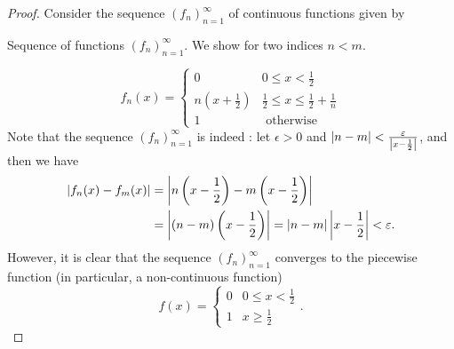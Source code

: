 \documentclass[notoc,notitlepage]{tufte-book}
\begin{document}
\begin{proof}
  Consider the sequence $(f_n)_{n=1}^{\infty}$ of continuous functions given by
  \begin{marginfigure}
    \centering
    \caption{Sequence of functions $(f_n)_{n=1}^{\infty}$. We show for two indices $n < m$.}\label{fig:sequence_of_functions_f_n___n_1_infty_we_show_for_two_indices_n_m_}
  \end{marginfigure}
  \begin{equation*}
    f_n(x) = \begin{cases}
      0 & 0 \leq x < \frac{1}{2} \\
      n \left( x + \frac{1}{2} \right) & \frac{1}{2} \leq x \leq \frac{1}{2} +
      \frac{1}{n} \\
      1 & \text{ otherwise }
    \end{cases}
  \end{equation*}
  Note that the sequence $(f_n)_{n=1}^{\infty}$ is indeed : let
  $\epsilon > 0$ and $\left|n - m\right| < \frac{\varepsilon}{\left|x - \frac{1}{2}\right|}$, and
  then we have
  \begin{align*}
    \left|f_n(x) - f_m(x)\right|
    &= \left|n \left( x - \frac{1}{2} \right) - m \left( x - \frac{1}{2}\right)\right|
    \\
    &= \left|(n - m) \left( x - \frac{1}{2} \right)\right|
    = \left|n-m\right|\left|x - \frac{1}{2}\right| < \varepsilon.
  \end{align*}
  However, it is clear that the sequence $(f_n)_{n=1}^{\infty}$ converges to the
  piecewise function (in particular, a non-continuous function)
  \begin{equation*}
    f(x) = \begin{cases}
      0 & 0 \leq x < \frac{1}{2} \\
      1 & x \geq \frac{1}{2}
    \end{cases}.
  \end{equation*}
\end{proof}
\end{document}
